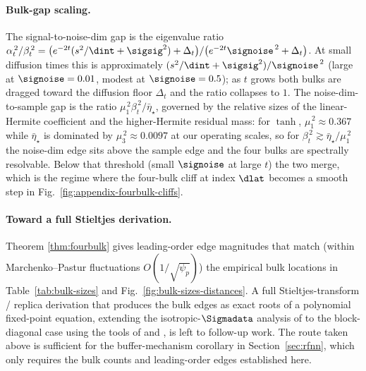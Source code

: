 \paragraph{Bulk-gap scaling.}
The signal-to-noise-dim gap is the eigenvalue ratio
$\alpha_t^{\,2}/\beta_t^{\,2}
 = \bigl(e^{-2t}(s^2/\dint+\sigsig^2)+\Delta_t\bigr)/\bigl(e^{-2t}\signoise^{\,2}+\Delta_t\bigr)$.
At small diffusion times this is approximately
$(s^2/\dint+\sigsig^2)/\signoise^{\,2}$ (large at $\signoise=0.01$,
modest at $\signoise=0.5$); as $t$ grows both bulks are dragged
toward the diffusion floor $\Delta_t$ and the ratio collapses to $1$.
The noise-dim-to-sample gap is the ratio
$\mu_1^{\,2}\beta_t^{\,2}/\bar\eta_\star$, governed by the relative
sizes of the linear-Hermite coefficient and the higher-Hermite
residual mass: for $\tanh$, $\mu_1^{\,2} \approx 0.367$ while
$\bar\eta_\star$ is dominated by $\mu_3^{\,2} \approx 0.0097$ at our
operating scales, so for $\beta_t^{\,2} \gtrsim \bar\eta_\star/\mu_1^{\,2}$
the noise-dim edge sits above the sample edge and the four bulks
are spectrally resolvable. Below that threshold (small $\signoise$ at
large $t$) the two merge, which is the regime where the four-bulk
cliff at index $\dlat$ becomes a smooth step in
Fig.~\ref{fig:appendix-fourbulk-cliffs}.

\paragraph{Toward a full Stieltjes derivation.}
Theorem \ref{thm:fourbulk} gives leading-order edge magnitudes that
match (within Marchenko--Pastur fluctuations $O(1/\sqrt{\psi_p})$)
the empirical bulk locations in Table~\ref{tab:bulk-sizes} and
Fig.~\ref{fig:bulk-sizes-distances}. A full Stieltjes-transform /
replica derivation that produces the bulk edges as exact roots of a
polynomial fixed-point equation, extending the isotropic-$\Sigmadata$
analysis of \citet{bonnaire2025} to the block-diagonal case using the
tools of \citet{ELKaroui2010spectrum} and
\citet{benigni2021eigenvalue}, is left to follow-up work. The route
taken above is sufficient for the buffer-mechanism corollary in
Section~\ref{sec:rfnn}, which only requires the bulk counts and
leading-order edges established here.
